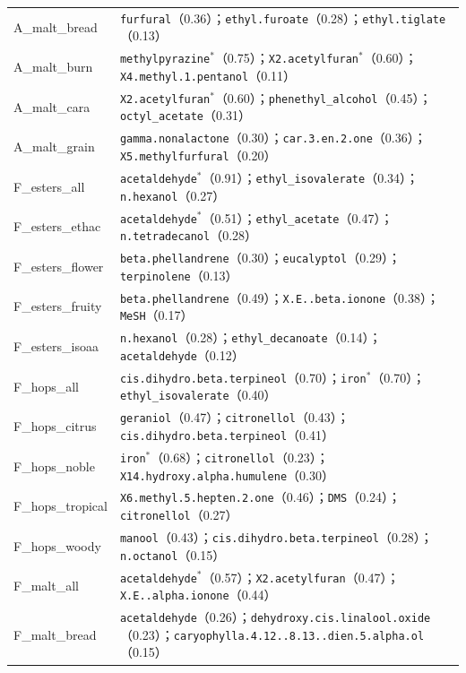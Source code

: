 \begin{longtable}{L{0.30\columnwidth}L{0.62\columnwidth}}
A\_malt\_bread & \texttt{furfural}（0.36）；\texttt{ethyl.furoate}（0.28）；\texttt{ethyl.tiglate}（0.13） \\
A\_malt\_burn & \texttt{methylpyrazine}$^{\ast}$（0.75）；\texttt{X2.acetylfuran}$^{\ast}$（0.60）；\texttt{X4.methyl.1.pentanol}（0.11） \\
A\_malt\_cara & \texttt{X2.acetylfuran}$^{\ast}$（0.60）；\texttt{phenethyl\_alcohol}（0.45）；\texttt{octyl\_acetate}（0.31） \\
A\_malt\_grain & \texttt{gamma.nonalactone}（0.30）；\texttt{car.3.en.2.one}（0.36）；\texttt{X5.methylfurfural}（0.20） \\
F\_esters\_all & \texttt{acetaldehyde}$^{\ast}$（0.91）；\texttt{ethyl\_isovalerate}（0.34）；\texttt{n.hexanol}（0.27） \\
F\_esters\_ethac & \texttt{acetaldehyde}$^{\ast}$（0.51）；\texttt{ethyl\_acetate}（0.47）；\texttt{n.tetradecanol}（0.28） \\
F\_esters\_flower & \texttt{beta.phellandrene}（0.30）；\texttt{eucalyptol}（0.29）；\texttt{terpinolene}（0.13） \\
F\_esters\_fruity & \texttt{beta.phellandrene}（0.49）；\texttt{X.E..beta.ionone}（0.38）；\texttt{MeSH}（0.17） \\
F\_esters\_isoaa & \texttt{n.hexanol}（0.28）；\texttt{ethyl\_decanoate}（0.14）；\texttt{acetaldehyde}（0.12） \\
F\_hops\_all & \texttt{cis.dihydro.beta.terpineol}（0.70）；\texttt{iron}$^{\ast}$（0.70）；\texttt{ethyl\_isovalerate}（0.40） \\
F\_hops\_citrus & \texttt{geraniol}（0.47）；\texttt{citronellol}（0.43）；\texttt{cis.dihydro.beta.terpineol}（0.41） \\
F\_hops\_noble & \texttt{iron}$^{\ast}$（0.68）；\texttt{citronellol}（0.23）；\texttt{X14.hydroxy.alpha.humulene}（0.30） \\
F\_hops\_tropical & \texttt{X6.methyl.5.hepten.2.one}（0.46）；\texttt{DMS}（0.24）；\texttt{citronellol}（0.27） \\
F\_hops\_woody & \texttt{manool}（0.43）；\texttt{cis.dihydro.beta.terpineol}（0.28）；\texttt{n.octanol}（0.15） \\
F\_malt\_all & \texttt{acetaldehyde}$^{\ast}$（0.57）；\texttt{X2.acetylfuran}（0.47）；\texttt{X.E..alpha.ionone}（0.44） \\
F\_malt\_bread & \texttt{acetaldehyde}（0.26）；\texttt{dehydroxy.cis.linalool.oxide}（0.23）；\texttt{caryophylla.4.12..8.13..dien.5.alpha.ol}（0.15） \\

\end{longtable}
